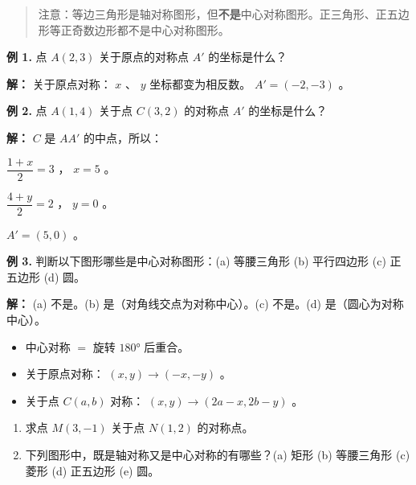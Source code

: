 \begin{quote}
注意：等边三角形是轴对称图形，但\textbf{不是}中心对称图形。正三角形、正五边形等正奇数边形都不是中心对称图形。
\end{quote}


\begin{workedexamples}


\textbf{例 1.} 点 $A(2, 3)$ 关于原点的对称点 $A'$ 的坐标是什么？

\textbf{解：}
关于原点对称： $x$ 、 $y$ 坐标都变为相反数。 $A' = (-2, -3)$ 。

\textbf{例 2.} 点 $A(1, 4)$ 关于点 $C(3, 2)$ 的对称点 $A'$ 的坐标是什么？

\textbf{解：}
$C$ 是 $AA'$ 的中点，所以：

$\dfrac{1 + x}{2} = 3$ ， $x = 5$ 。

$\dfrac{4 + y}{2} = 2$ ， $y = 0$ 。

$A' = (5, 0)$ 。

\textbf{例 3.} 判断以下图形哪些是中心对称图形：(a) 等腰三角形 (b) 平行四边形 (c) 正五边形 (d) 圆。

\textbf{解：}
(a) 不是。(b) 是（对角线交点为对称中心）。(c) 不是。(d) 是（圆心为对称中心）。

\end{workedexamples}

\begin{keytakeaway}


\begin{itemize}
  \item 中心对称 $=$ 旋转 $180°$ 后重合。
  \item 关于原点对称： $(x, y) \to (-x, -y)$ 。
  \item 关于点 $C(a, b)$ 对称： $(x, y) \to (2a - x, 2b - y)$ 。
\end{itemize}


\end{keytakeaway}

\begin{practice}


\begin{enumerate}
  \item 求点 $M(3, -1)$ 关于点 $N(1, 2)$ 的对称点。
  \item 下列图形中，既是轴对称又是中心对称的有哪些？(a) 矩形 (b) 等腰三角形 (c) 菱形 (d) 正五边形 (e) 圆。
\end{enumerate}


\end{practice}



